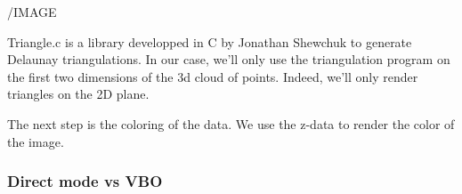 /IMAGE

Triangle.c is a library developped in C by Jonathan Shewchuk \cite{shewchuk96b} to generate Delaunay triangulations. In our case, we'll only use the triangulation program on the first two dimensions of the 3d cloud of points. Indeed, we'll only render triangles on the 2D plane.

The next step is the coloring of the data. We use the z-data to render the color of the image. 


\subsubsection{Direct mode vs VBO}



